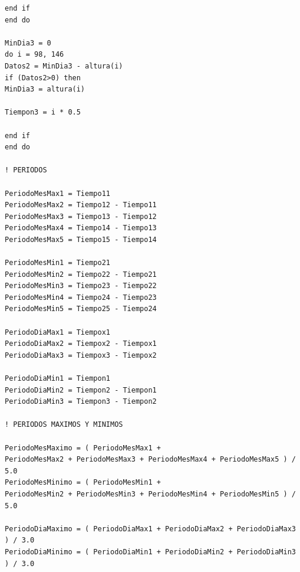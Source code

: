 \documentclass[10pt]{article}
\begin{document}
\begin{verbatim}
end if
end do

MinDia3 = 0
do i = 98, 146
Datos2 = MinDia3 - altura(i)
if (Datos2>0) then 
MinDia3 = altura(i)

Tiempon3 = i * 0.5

end if 
end do 

! PERIODOS

PeriodoMesMax1 = Tiempo11
PeriodoMesMax2 = Tiempo12 - Tiempo11
PeriodoMesMax3 = Tiempo13 - Tiempo12
PeriodoMesMax4 = Tiempo14 - Tiempo13
PeriodoMesMax5 = Tiempo15 - Tiempo14

PeriodoMesMin1 = Tiempo21
PeriodoMesMin2 = Tiempo22 - Tiempo21
PeriodoMesMin3 = Tiempo23 - Tiempo22
PeriodoMesMin4 = Tiempo24 - Tiempo23
PeriodoMesMin5 = Tiempo25 - Tiempo24

PeriodoDiaMax1 = Tiempox1
PeriodoDiaMax2 = Tiempox2 - Tiempox1
PeriodoDiaMax3 = Tiempox3 - Tiempox2

PeriodoDiaMin1 = Tiempon1
PeriodoDiaMin2 = Tiempon2 - Tiempon1
PeriodoDiaMin3 = Tiempon3 - Tiempon2

! PERIODOS MAXIMOS Y MINIMOS

PeriodoMesMaximo = ( PeriodoMesMax1 + 
PeriodoMesMax2 + PeriodoMesMax3 + PeriodoMesMax4 + PeriodoMesMax5 ) / 5.0
PeriodoMesMinimo = ( PeriodoMesMin1 + 
PeriodoMesMin2 + PeriodoMesMin3 + PeriodoMesMin4 + PeriodoMesMin5 ) / 5.0

PeriodoDiaMaximo = ( PeriodoDiaMax1 + PeriodoDiaMax2 + PeriodoDiaMax3 ) / 3.0
PeriodoDiaMinimo = ( PeriodoDiaMin1 + PeriodoDiaMin2 + PeriodoDiaMin3 ) / 3.0






\end{verbatim}
\end{document}
